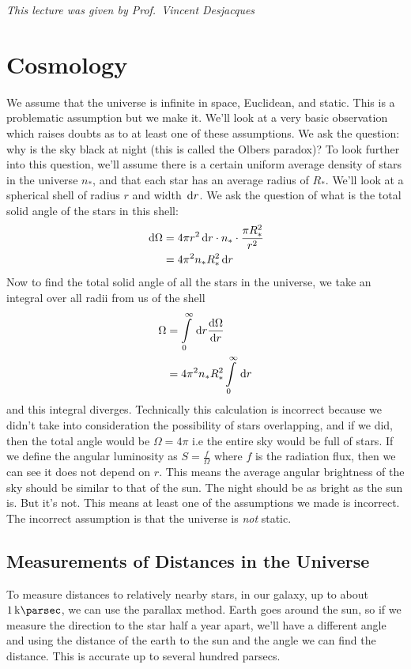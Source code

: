 \emph{This lecture was given by Prof.\ Vincent Desjacques}

\section{Cosmology}
We assume that the universe is infinite in space, Euclidean, and static. This is a problematic assumption but we make it. We'll look at a very basic observation which raises doubts as to at least one of these assumptions. We ask the question: why is the sky black at night (this is called the Olbers paradox)? To look further into this question, we'll assume there is a certain uniform average density of stars in the universe \(n_*\), and that each star has an average radius of \(R_*\). We'll look at a spherical shell of radius \(r\) and width \(\dl r\). We ask the question of what is the total solid angle of the stars in this shell:
\begin{align}
  \dl \Omega &= 4\pi r^2 \dl r \cdot n_* \cdot \frac{\pi R_*^2}{r^2} \\
  &= 4\pi^2n_* R_*^2 \dl r
\end{align}
Now to find the total solid angle of all the stars in the universe, we take an integral over all radii from us of the shell
\begin{align}
  \Omega &= \int\limits_0^\infty \dl r \diff{\Omega}{r} \\
  &= 4\pi^2 n_* R_*^2 \int\limits_0^\infty \dl r
\end{align}
and this integral diverges. Technically this calculation is incorrect because we didn't take into consideration the possibility of stars overlapping, and if we did, then the total angle would be \(\Omega = 4\pi \) i.e the entire sky would be full of stars. If we define the angular luminosity as \(S = \frac{f}{\Omega}\) where \(f\) is the radiation flux, then we can see it does not depend on \(r\). This means the average angular brightness of the sky should be similar to that of the sun. The night should be as bright as the sun is. But it's not. This means at least one of the assumptions we made is incorrect. The incorrect assumption is that the universe is \emph{not} static.
\subsection{Measurements of Distances in the Universe}
To measure distances to relatively nearby stars, in our galaxy, up to about \(\qty{1}{\kilo\parsec}\), we can use the parallax method. Earth goes around the sun, so if we measure the direction to the star half a year apart, we'll have a different angle and using the distance of the earth to the sun and the angle we can find the distance. This is accurate up to several hundred parsecs.

